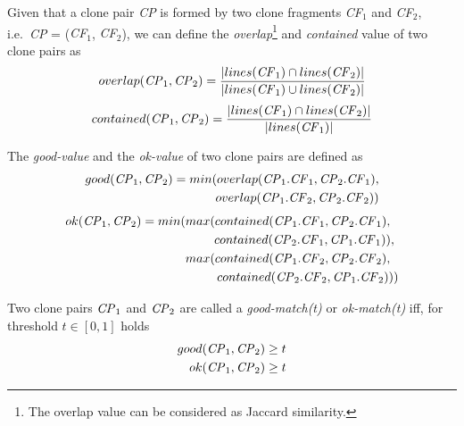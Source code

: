 \documentclass[sigconf,review, anonymous]{acmart}
\newcommand{\squeezeup}{\vspace{-0.5mm}}
\begin{document}
Given that a clone pair \textit{CP} is formed by two clone fragments
\textit{CF$_1$} and \textit{CF$_2$}, i.e.~\textit{CP} = (\textit{CF$_1$},
\textit{CF$_2$}), we can define the \textit{overlap}\footnote{The overlap value can be considered as Jaccard similarity.} and
\textit{contained} value of two clone pairs as
\begin{displaymath}
  overlap(\textrm{\textit{CP}}_1, \textrm{\textit{CP}}_2) = \frac{|lines(\textrm{\textit{CF}}_1) \cap lines(\textrm{\textit{CF}}_2)|}{|lines(\textrm{\textit{CF}}_1) \cup lines(\textrm{\textit{CF}}_2)|} 
\end{displaymath}
\begin{displaymath}
  contained(\textrm{\textit{CP}}_1, \textrm{\textit{CP}}_2) = \frac{|lines(\textrm{\textit{CF}}_1) \cap lines(\textrm{\textit{CF}}_2)|}{|lines(\textrm{\textit{CF}}_1)|}
\end{displaymath}
      
\noindent%
The \textit{good-value}  and the \textit{ok-value}  of two clone pairs are defined as
\begin{align*}
	good(\textrm{\textit{CP}}_1, \textrm{\textit{CP}}_2) = min(overlap(\textrm{\textit{CP}}_1.\textrm{\textit{CF}}_1,\textrm{\textit{CP}}_2.\textrm{\textit{CF}}_1), \\ overlap(\textrm{\textit{CP}}_1.\textrm{\textit{CF}}_2,\textrm{\textit{CP}}_2.\textrm{\textit{CF}}_2))
\end{align*}
\begin{align*}
	ok(\textrm{\textit{CP}}_1,\textrm{\textit{CP}}_2) = min(max(contained(\textrm{\textit{CP}}_1.\textrm{\textit{CF}}_1,\textrm{\textit{CP}}_2.\textrm{\textit{CF}}_1),~~ \\ contained(\textrm{\textit{CP}}_2.\textrm{\textit{CF}}_1,\textrm{\textit{CP}}_1.\textrm{\textit{CF}}_1)),~
	\\ max(contained(\textrm{\textit{CP}}_1.\textrm{\textit{CF}}_2,\textrm{\textit{CP}}_2.\textrm{\textit{CF}}_2),~~ \\contained(\textrm{\textit{CP}}_2.\textrm{\textit{CF}}_2,\textrm{\textit{CP}}_1.\textrm{\textit{CF}}_2)))
\end{align*}

\noindent%
Two clone pairs $\textrm{\textit{CP}}_1$ and $\textrm{\textit{CP}}_2$
are called a \textit{\textit{good-match}(t)} or \textit{ok-match(t)}  iff, for threshold $t \in [0,1]$ holds 
\begin{align*}
good(\textrm{\textit{CP}}_1,\textrm{\textit{CP}}_2) & \geq t\\
ok(\textrm{\textit{CP}}_1,\textrm{\textit{CP}}_2) & \geq t
\end{align*}
\end{document}
